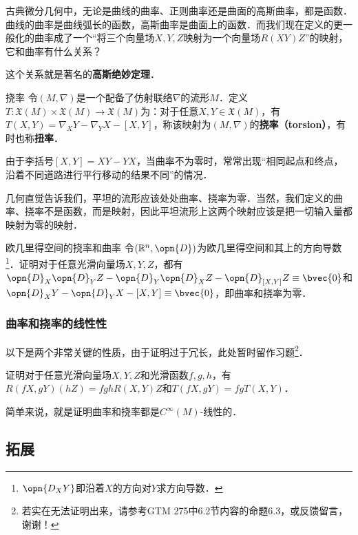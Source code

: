 古典微分几何中，无论是曲线的曲率、正则曲率还是曲面的高斯曲率，都是函数．曲线的曲率是曲线弧长的函数，高斯曲率是曲面上的函数．而我们现在定义的更一般化的曲率成了一个“将三个向量场$X, Y, Z$映射为一个向量场$R(XY)Z$”的映射，它和曲率有什么关系？

这个关系就是著名的\textbf{高斯绝妙定理}．


\begin{definition}{挠率}
令$(M, \nabla)$是一个配备了仿射联络$\nabla$的流形$M$．定义$T:\mathfrak{X}(M)\times\mathfrak{X}(M)\to\mathfrak{X}(M)$为：对于任意$X, Y\in\mathfrak{X}(M)$，有$T(X, Y)=\nabla_XY-\nabla_YX-{[X, Y]}$，称该映射为$(M, \nabla)$的\textbf{挠率（torsion）}，有时也称\textbf{扭率}．
\end{definition}

由于李括号$[X, Y]=XY-YX$，当曲率不为零时，常常出现“相同起点和终点，沿着不同道路进行平行移动的结果不同”的情况．

几何直觉告诉我们，平坦的流形应该处处曲率、挠率为零．当然，我们定义的曲率、挠率不是函数，而是映射，因此平坦流形上这两个映射应该是把一切输入量都映射为零的映射．

\begin{exercise}{欧几里得空间的挠率和曲率}
令$(\mathbb{R}^n, \opn{D})$为欧几里得空间和其上的方向导数\footnote{$\opn{D_XY}$即沿着$X$的方向对$Y$求方向导数．}．证明对于任意光滑向量场$X, Y, Z$，都有$\opn{D}_X\opn{D}_YZ-\opn{D}_Y\opn{D}_XZ-\opn{D}_{[X, Y]}Z\equiv\bvec{0}$和$\opn{D}_XY-\opn{D}_YX-{[X, Y]}\equiv\bvec{0}$，即曲率和挠率为零．
\end{exercise}

\subsubsection{曲率和挠率的线性性}

以下是两个非常关键的性质，由于证明过于冗长，此处暂时留作习题\footnote{若实在无法证明出来，请参考GTM 275\cite{GTM275}中6.2节内容的命题6.3，或反馈留言，谢谢！}．

\begin{exercise}{}\label{affcon_exe1}
证明对于任意光滑向量场$X, Y, Z$和光滑函数$f, g, h$，有$R(fX, gY)(hZ)=fghR(X, Y)Z$和$T(fX, gY)=fgT(X, Y)$．

简单来说，就是证明曲率和挠率都是$C^{\infty}(M)$-线性的．
\end{exercise}





\subsection{拓展}

